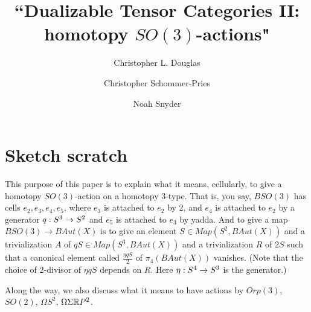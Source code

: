 \documentclass{amsart}
\begin{document}
\title{``Dualizable Tensor Categories II: homotopy $SO(3)$-actions"}

\author{Christopher L. Douglas}
\address{Mathematical Institute\\ University of Oxford\\ Oxford OX1 3LB\\ United Kingdom}
      	
\author{Christopher Schommer-Pries}
\address{Department of Mathematics\\ Massachusetts Institute of Technology\\ Cambridge, MA 02139\\ USA}

\author{Noah Snyder}
\address{Department of Mathematics\\ Columbia University\\ New York, NY 10027\\ USA}


\maketitle

\tableofcontents

\section*{Sketch scratch}

This purpose of this paper is to explain what it means, cellularly, to give a homotopy $SO(3)$-action on a homotopy 3-type.  That is, you say, $BSO(3)$ has cells $e_2, e_3, e_4, e_5$, where $e_3$ is attached to $e_2$ by $2$, and $e_4$ is attached to $e_2$ by a generator $q: S^3 \rightarrow S^2$ and $e_5$ is attached to $e_3$ by yadda.  And to give a map $BSO(3) \rightarrow BAut(X)$ is to give an element $S \in Map(S^2,BAut(X))$ and a trivialization $A$ of $q S \in Map(S^3,BAut(X))$ and a trivialization $R$ of $2S$ such that a canonical element called $\frac{\eta q S}{2}$ of $\pi_4(BAut(X))$ vanishes.  (Note that the choice of 2-divisor of $\eta q S$ depends on $R$.  Here $\eta: S^4 \rightarrow S^3$ is the generator.)

Along the way, we also discuss what it means to have actions by $Orp(3)$, $SO(2)$, $\Omega S^2$, $\Omega \Sigma \mathbb R P^2$.
\end{document}
